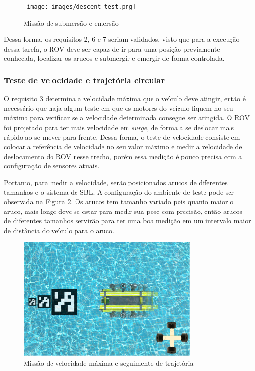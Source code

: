 \begin{figure}[h]
	\label{fig:descent-test}
	\caption{Missão de submersão e emersão}
	\centering
	\texttt{[image: images/descent\_test.png]}
\end{figure}

Dessa forma, os requisitos 2, 6 e 7 seriam validados, visto que para a execução dessa tarefa, o ROV deve ser capaz de ir para uma posição previamente conhecida, localizar os arucos e submergir e emergir de forma controlada.

\subsubsection{Teste de velocidade e trajetória circular}

O requisito 3 determina a velocidade máxima que o veículo deve atingir, então é necessário que haja algum teste em que os motores do veículo fiquem no seu máximo para verificar se a velocidade determinada consegue ser atingida. O ROV foi projetado para ter mais velocidade em \textit{surge}, de forma a se deslocar mais rápido ao se mover para frente. Dessa forma, o teste de velocidade consiste em colocar a referência de velocidade no seu valor máximo e medir a velocidade de deslocamento do ROV nesse trecho, porém essa medição é pouco precisa com a configuração de sensores atuais.

Portanto, para medir a velocidade, serão posicionados arucos de diferentes tamanhos e o sistema de SBL. A configuração do ambiente de teste pode ser observada na Figura \ref{fig:speed-test}. Os arucos tem tamanho variado pois quanto maior o aruco, mais longe deve-se estar para medir sua pose com precisão, então arucos de diferentes tamanhos servirão para ter uma boa medição em um intervalo maior de distância do veículo para o aruco.

\begin{figure}[h]
	\label{fig:speed-test}
	\caption{Missão de velocidade máxima e seguimento de trajetória}
	\centering
	\includegraphics[width=0.8\textwidth]{images/speed_test.png}
\end{figure}

